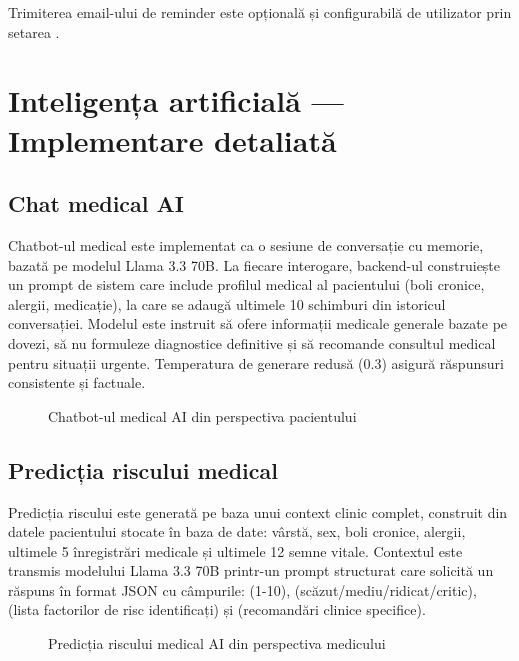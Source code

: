 Trimiterea email-ului de reminder este opțională și configurabilă de utilizator prin setarea .

\section{Inteligența artificială — Implementare detaliată}

\subsection{Chat medical AI}

Chatbot-ul medical este implementat ca o sesiune de conversație cu memorie, bazată pe modelul Llama 3.3 70B. La fiecare interogare, backend-ul construiește un prompt de sistem care include profilul medical al pacientului (boli cronice, alergii, medicație), la care se adaugă ultimele 10 schimburi din istoricul conversației. Modelul este instruit să ofere informații medicale generale bazate pe dovezi, să nu formuleze diagnostice definitive și să recomande consultul medical pentru situații urgente. Temperatura de generare redusă (0.3) asigură răspunsuri consistente și factuale.

\begin{figure}[H]
  \centering
  \caption{Chatbot-ul medical AI din perspectiva pacientului}
  \label{fig:chat_ai}
\end{figure}

\subsection{Predicția riscului medical}

Predicția riscului este generată pe baza unui context clinic complet, construit din datele pacientului stocate în baza de date: vârstă, sex, boli cronice, alergii, ultimele 5 înregistrări medicale și ultimele 12 semne vitale. Contextul este transmis modelului Llama 3.3 70B printr-un prompt structurat care solicită un răspuns în format JSON cu câmpurile:  (1-10),  (scăzut/mediu/ridicat/critic),  (lista factorilor de risc identificați) și  (recomandări clinice specifice).

\begin{figure}[H]
  \centering
  \caption{Predicția riscului medical AI din perspectiva medicului}
  \label{fig:predictie_risc}
\end{figure}


